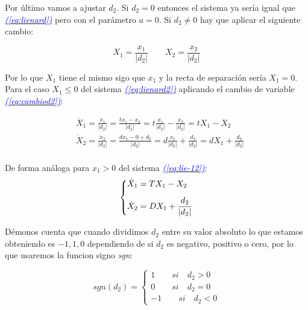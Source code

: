 \documentclass[12pt,a4paper]{report} %
\newcommand{\eref}[1]{\hyperref[#1]{\textcolor{blue}{\textit{(\ref*{#1})}}}}
\begin{document}
	Por último vamos a ajustar $d_2$. Si $d_2=0$ entonces el sistema ya sería igual que \eref{eq:lienard} pero con el parámetro $a=0$. Si $d_2\neq0$ hay que aplicar el siguiente cambio:
	
	\begin{equation}
		\label{eq:cambiod2}
		X_1=\frac{x_1}{|d_2|} \qquad X_2=\frac{x_2}{|d_2|}
	\end{equation}\smallskip
	
	Por lo que $X_1$ tiene el mismo sigo que $x_1$ y la recta de separación sería $X_1=0$.\\[0.5cm]
	Para el caso $X_1\leq 0$ del sistema \eref{eq:lienard2} aplicando el cambio de variable \eref{eq:cambiod2}:
	
	\begin{equation}
		\label{eq:q3}
		\begin{aligned}
			&\dot{X}_1=\frac{\dot{x}_1}{|d_2|}=\frac{tx_1-x_2}{|d_2|}=t\frac{x_1}{|d_2|}-\frac{x_2}{|d_2|}=tX_1-X_2\\[2mm]
			&\dot{X}_2=\frac{\dot{x}_2}{|d_2|}=\frac{dx_1-0+d_2}{|d_2|}=d\frac{x_1}{|d_2|}+\frac{d_2}{|d_2|}=dX_1+\frac{d_2}{|d_2|}\\[2mm]
		\end{aligned}
	\end{equation}\smallskip
	
	De forma análoga para $x_1>0$ del sistema \eref{eq:lie-12}:
	\begin{equation}
		\label{eq:q4}
		\scalebox{1}{$\displaystyle
			\left\{
			\begin{aligned}
				&\dot{X}_1=TX_1-X_2 \\[2mm]
				&\dot{X}_2=DX_1+\frac{d_2}{|d_2|}
			\end{aligned}
			\right.
			$}
	\end{equation}\smallskip
	
	Démonos cuenta que cuando dividimos $d_2$ entre su valor absoluto lo que estamos obteniendo es $-1,1,0$ dependiendo de si $d_2$ es negativo, positivo o cero, por lo que usaremos la funcion signo \textit{sgn}:
	
	\begin{equation}
		\label{eq:sgn}
		sgn(d_2)=\left\{
		\begin{aligned}
		1 \qquad si  \quad d_2>0 \\
		0 \qquad si  \quad d_2=0 \\
		-1 \qquad si \quad d_2<0 
    	\end{aligned}
		\right.
	\end{equation}\smallskip
	
\end{document}

